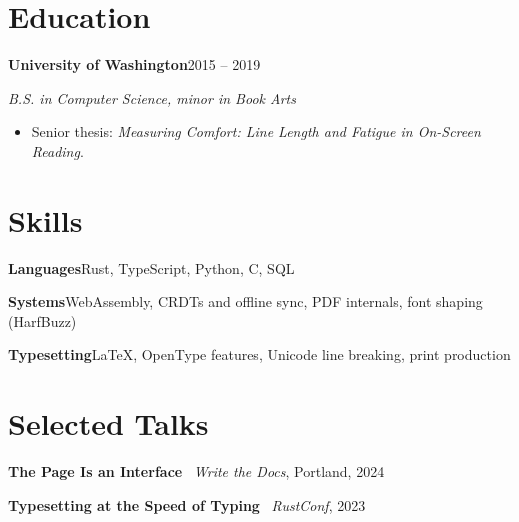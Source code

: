 \documentclass[letterpaper,11pt]{article}
\newcommand{\role}[4]{%
  \par\vspace{4pt}
  {\bfseries\color{ink}#1}\enspace{\small\color{mist}#2}\hfill{\small\color{mist}#4}\par
  {\itshape #3}\par}
\begin{document}
\section{Education}

\role{University of Washington}{Seattle, WA}{B.S. in Computer Science, minor in Book Arts}{2015 -- 2019}
\begin{itemize}
  \item Senior thesis: \emph{Measuring Comfort: Line Length and Fatigue in On-Screen Reading}.
\end{itemize}

\section{Skills}

\textbf{Languages}\enspace Rust, TypeScript, Python, C, SQL\par
\textbf{Systems}\enspace WebAssembly, CRDTs and offline sync, PDF internals, font shaping (HarfBuzz)\par
\textbf{Typesetting}\enspace \LaTeX{}, OpenType features, Unicode line breaking, print production

\section{Selected Talks}

\textbf{The Page Is an Interface} \textendash\ \emph{Write the Docs}, Portland, 2024\par
\textbf{Typesetting at the Speed of Typing} \textendash\ \emph{RustConf}, 2023
\end{document}
